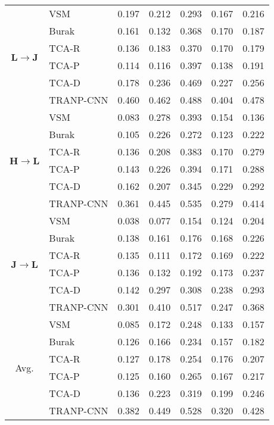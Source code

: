 \begin{table}[htbp]
{\begin{tabular}{c|l|c|c|c|c|c}
          \midrule
    \multirow{6}[0]{*}{\textbf{L}$\rightarrow$\textbf{J}} & VSM   & 0.197  & 0.212  & 0.293  & 0.167  & 0.216  \\
          & Burak & 0.161  & 0.132  & 0.368  & 0.170  & 0.187  \\
          & TCA-R & 0.136  & 0.183  & 0.370  & 0.170  & 0.179  \\
          & TCA-P & 0.114  & 0.116  & 0.397  & 0.138  & 0.191  \\
          & TCA-D & 0.178  & 0.236  & 0.469  & 0.227  & 0.256  \\
          & TRANP-CNN & 0.460  & 0.462  & 0.488  & 0.404  & 0.478  \\
          \midrule
    \multirow{6}[0]{*}{\textbf{H}$\rightarrow$\textbf{L}} & VSM   & 0.083  & 0.278  & 0.393  & 0.154  & 0.136  \\
          & Burak & 0.105  & 0.226  & 0.272  & 0.123  & 0.222  \\
          & TCA-R & 0.136  & 0.208  & 0.383  & 0.170  & 0.279  \\
          & TCA-P & 0.143  & 0.226  & 0.394  & 0.171  & 0.288  \\
          & TCA-D & 0.162  & 0.207  & 0.345  & 0.229  & 0.292  \\
          & TRANP-CNN & 0.361  & 0.445  & 0.535  & 0.279  & 0.414  \\
          \midrule
    \multirow{6}[0]{*}{\textbf{J}$\rightarrow$\textbf{L}} & VSM   & 0.038  & 0.077  & 0.154  & 0.124  & 0.204  \\
          & Burak & 0.138  & 0.161  & 0.176  & 0.168  & 0.226  \\
          & TCA-R & 0.135  & 0.111  & 0.172  & 0.169  & 0.222  \\
          & TCA-P & 0.136  & 0.132  & 0.192  & 0.173  & 0.237  \\
          & TCA-D & 0.142  & 0.297  & 0.308  & 0.238  & 0.293  \\
          & TRANP-CNN & 0.301  & 0.410  & 0.517  & 0.247  & 0.368  \\
          \midrule
    \multirow{6}[0]{*}{Avg.} & VSM   & 0.085  & 0.172  & 0.248  & 0.133  & 0.157  \\
          & Burak & 0.126  & 0.166  & 0.234  & 0.157  & 0.182  \\
          & TCA-R & 0.127  & 0.178  & 0.254  & 0.176  & 0.207  \\
          & TCA-P & 0.125  & 0.160  & 0.265  & 0.167  & 0.217  \\
          & TCA-D & 0.136  & 0.223  & 0.319  & 0.199  & 0.246  \\
          & TRANP-CNN & 0.382  & 0.449  & 0.528  & 0.320  & 0.428  \\
          \bottomrule
    \end{tabular}%
    }
  \label{tab:results3}%
\end{table}%

